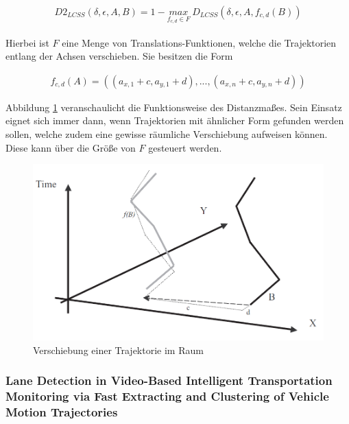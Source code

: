 \begin{ceqn}
\begin{align}
    D2_{LCSS}(\delta, \epsilon, A, B) = 1 - \underset{f_{c,d} \in F}{max}\ D_{LCSS}(\delta, \epsilon, A, f_{c,d}(B))
\end{align}
\end{ceqn}

Hierbei ist $F$ eine Menge von Translations-Funktionen, welche die Trajektorien entlang der Achsen verschieben.
Sie besitzen die Form

\begin{ceqn}
\begin{align}
    f_{c, d}(A) = ((a_{x, 1} + c, a_{y, 1} + d), ..., (a_{x, n} + c, a_{y, n} + d))
\end{align}
\end{ceqn}

Abbildung \ref{fig:relw_vlachos_translation} veranschaulicht die Funktionsweise des Distanzmaßes.
Sein Einsatz eignet sich immer dann, wenn Trajektorien mit ähnlicher Form gefunden werden sollen,
welche zudem eine gewisse räumliche Verschiebung aufweisen können. Diese kann über die Größe von $F$
gesteuert werden.

\begin{figure}[H]
    \centering
    \includegraphics[width=0.55\linewidth]{resources/img/RelatedWork/vlachos_translation}
    \caption[Verschiebung einer Trajektorie im Raum]{Verschiebung einer Trajektorie im Raum \cite[]{Vlachos2002}}
    \label{fig:relw_vlachos_translation}
\end{figure}

\subsubsection*{Lane Detection in Video-Based Intelligent Transportation Monitoring via Fast Extracting and Clustering of Vehicle Motion Trajectories}

